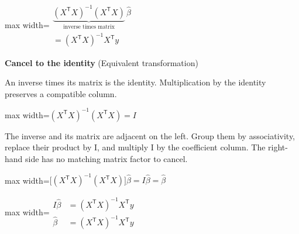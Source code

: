 \documentclass[11pt,a4paper]{article}
\begin{document}
\begin{center}\begin{adjustbox}{max width=\linewidth}$\displaystyle \begin{gathered}\underbrace{(X^{\mathsf T}X)^{-1}(X^{\mathsf T}X)}_{\text{inverse times matrix}}\,\widehat\beta\\[.28em]=(X^{\mathsf T}X)^{-1}X^{\mathsf T}y\end{gathered}$\end{adjustbox}\end{center}
\noindent\textbf{Cancel to the identity} (Equivalent transformation)\par
An inverse times its matrix is the identity. Multiplication by the identity preserves a compatible column.
\begin{center}\begin{adjustbox}{max width=\linewidth}$\displaystyle (X^{\mathsf T}X)^{-1}(X^{\mathsf T}X)=I$\end{adjustbox}\end{center}

The inverse and its matrix are adjacent on the left. Group them by associativity, replace their product by I, and multiply I by the coefficient column. The right-hand side has no matching matrix factor to cancel.
\begin{center}\begin{adjustbox}{max width=\linewidth}$\displaystyle \bigl[(X^{\mathsf T}X)^{-1}(X^{\mathsf T}X)\bigr]\widehat\beta=I\widehat\beta=\widehat\beta$\end{adjustbox}\end{center}


\begin{center}\begin{adjustbox}{max width=\linewidth}$\displaystyle \begin{aligned} I\widehat\beta&=(X^{\mathsf T}X)^{-1}X^{\mathsf T}y\\[.35em]\widehat\beta&=(X^{\mathsf T}X)^{-1}X^{\mathsf T}y\end{aligned}$\end{adjustbox}\end{center}
\end{document}
